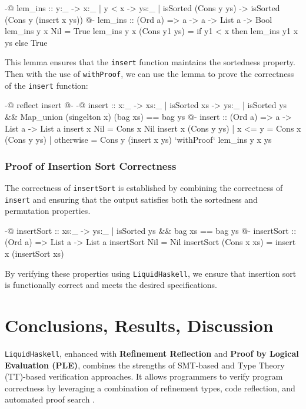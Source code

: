 \documentclass[]{rptuseminar}
\begin{document}
\begin{haskell}
{-@ lem_ins :: y:_ -> {x:_ | y < x} -> {ys:_ | isSorted (Cons y ys)} 
    -> {isSorted (Cons y (insert x ys))} @-}
lem_ins :: (Ord a) => a -> a -> List a -> Bool
lem_ins y x Nil = True
lem_ins y x (Cons y1 ys) = if y1 < x then lem_ins y1 x ys else True
\end{haskell}

This lemma ensures that the \texttt{insert} function maintains the sortedness property.
Then with the use of \texttt{withProof}, we can use the lemma to prove the correctness of the \texttt{insert} function:

\begin{haskell}
{-@ reflect insert @-}
{-@ insert :: x:_ -> {xs:_ | isSorted xs} 
  -> {ys:_ | isSorted ys && Map_union (singelton x) (bag xs) == bag ys  } @-}
insert :: (Ord a) => a -> List a -> List a
insert x Nil = Cons x Nil
insert x (Cons y ys)
  | x <= y = Cons x (Cons y ys)
  | otherwise = Cons y (insert x ys) `withProof` lem_ins y x ys
\end{haskell}

\subsubsection{Proof of Insertion Sort Correctness}

The correctness of \texttt{insertSort} is established by combining the correctness of \texttt{insert} and ensuring that the output satisfies 
both the sortedness and permutation properties.

\begin{haskell}
{-@ insertSort :: xs:_ -> {ys:_ | isSorted ys && bag xs == bag ys} @-}
insertSort :: (Ord a) => List a -> List a
insertSort Nil = Nil
insertSort (Cons x xs) = insert x (insertSort xs)
\end{haskell}

By verifying these properties using \texttt{LiquidHaskell}, we ensure that insertion 
sort is functionally correct and meets the desired specifications.

\section{Conclusions, Results, Discussion}
\texttt{LiquidHaskell}, enhanced with \textbf{Refinement Reflection} and \textbf{Proof by Logical Evaluation (PLE)}, 
combines the strengths of SMT-based and Type Theory (TT)-based verification approaches. It allows programmers to verify program correctness 
by leveraging a combination of refinement types, code reflection, and automated proof search \cite{vazou_refinement_2018}.
\end{document}
